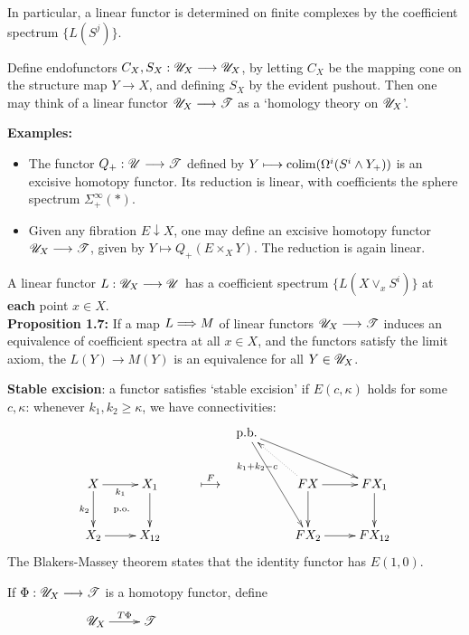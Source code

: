 \documentclass[11pt]{article}
\begin{document}
\begin{Calculus I}
\begin{itemise}
\begin{itemize}
In particular, a linear functor is determined on finite complexes by the coefficient spectrum $\{L(S^j)\}$.
\end{itemize}
\item Define endofunctors $C_X,S_X:\mathscr{U}_X\longrightarrow\mathscr{U}_X$, by letting $C_X$ be the mapping cone on the structure map $Y\to X$, and defining $S_X$ by the evident pushout. Then one may think of a linear functor $\mathscr{U}_X\longrightarrow\mathscr{T}$ as a `homology theory on $\mathscr{U}_X$'.
\item \textbf{Examples:} 
\begin{itemize}\squishlist
\setlength{\parindent}{.25in}
\item The functor $Q_+:\mathscr{U}\longrightarrow\mathscr{T}$ defined by $Y\longmapsto\operatorname*{colim}(\Omega^i(S^i\wedge Y_+))$ is an excisive homotopy functor. Its reduction is linear, with coefficients the sphere spectrum $\Sigma^\infty_+(*)$.
\item Given any fibration $E\downarrow X$, one may define an excisive homotopy functor $\mathscr{U}_X\longrightarrow \mathscr{T}$, given by $Y\mapsto Q_+(E\times _XY)$. The reduction is again linear.
\end{itemize}
\item A linear functor $L:\mathscr{U}_X\longrightarrow \mathscr{U}$ has a coefficient spectrum $\{L(X\vee _ xS^i)\}$ at \textbf{each} point $x\in X$.\\
\textbf{Proposition 1.7:} If a map $L\Longrightarrow M$ of linear functors $\mathscr{U}_X\longrightarrow\mathscr{T}$ induces an equivalence of coefficient spectra at all $x\in X$, and the functors satisfy the limit axiom, the $L(Y)\to M(Y)$ is an equivalence for all $Y\in\mathscr{U}_X$.
\item \textbf{Stable excision}: a functor satisfies `stable excision' if $E(c,\kappa)$ holds for some $c,\kappa$: whenever $k_1,k_2\geq\kappa$, we have connectivities:
\[\xymatrix{
&%
&%
&%
\textup{p.b.}
\ar[rrd]
\ar[rdd]
&%
&%
\\%
X\ar[r]_-{k_1}
\ar[d]_-{k_2}
\ar@{}[rd]|{\textup{p.o.}}
&%
X_1
\ar[d]
&%
\makebox[0cm][l]{\,$\overset{F}{\mapsto}$}&%
&
FX
\ar@{..>}[ul]^-{k_1+k_2-c}
\ar[r]
\ar[d]
&%
FX_1
\ar[d]
\\%
X_2\ar[r]
&%
X_{12}
&%
&&%
FX_{2}
\ar[r]
&%
FX_{12}
}\]
The Blakers-Massey theorem states that the identity functor has $E(1,0)$.
\item If $\Phi:\mathscr{U}_X\longrightarrow\mathscr{T}$ is a homotopy functor, define
\[\xymatrix@R=0mm{
\ar[r]^-{T\Phi}%
\scru_X&%
\scrt\qquad \qquad \qquad \qquad \qquad \qquad \qquad \qquad \qquad \\%
}\]
\end{itemise}
\end{Calculus I}
\end{document}

